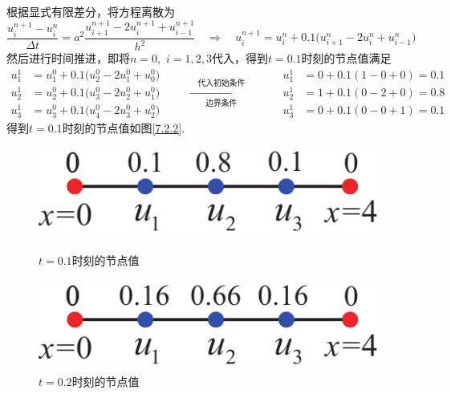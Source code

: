 \solve 根据显式有限差分，将方程离散为
\begin{equation*}
	\dfrac{u_i^{n+1}-u_i^n}{\Delta t} = a^2 \dfrac{u_{i+1}^{n+1} - 2u_i^{n+1} + u_{i-1}^{n+1}}{h^2}
	\quad \Rightarrow \quad
	u_i^{n+1} = u_i^n + 0.1\big(u_{i+1}^n -2u_i^n + u_{i-1}^n\big)
\end{equation*}
然后进行时间推进，即将$n=0,\,\,i=1,2,3$代入，得到$t=0.1$时刻的节点值满足
\begin{equation*}
	\begin{aligned}
		u_1^1 &= u_1^0 + 0.1\big(u_2^0 - 2u_1^0 + u_0^0\big)\\
		u_2^1 &= u_2^0 + 0.1\big(u_3^0 - 2u_2^0 +u_1^0\big)\\
		u_3^1 &= u_3^0 + 0.1\big(u_4^0 - 2u_3^0 + u_2^0\big)
	\end{aligned}
	\quad \quad \xrightarrow[\mbox{边界条件}]{\quad \mbox{代入初始条件} \quad} \quad \quad 
	\begin{aligned}
		u_1^1 &= 0+0.1(1-0+0)=0.1\\
		u_2^1 &= 1+0.1(0-2+0)=0.8\\
		u_3^1 &= 0 + 0.1(0-0+1)=0.1
	\end{aligned}
\end{equation*}
得到$t=0.1$时刻的节点值如图\ref{7.2.2}.
\begin{figure}[!htb]
	\centering
	\begin{minipage}{0.4\linewidth}
		\centering
		\includegraphics[width=0.6\linewidth]{pic/7.2.2.pdf}
		\vspace*{-0.8em}
		\caption{$t=0.1$时刻的节点值}
		\label{7.2.2}
	\end{minipage}
	\begin{minipage}{0.4\linewidth}
		\centering
		\includegraphics[width=0.6\linewidth]{pic/7.2.3.pdf}
		\vspace*{-0.5em}
		\caption{$t=0.2$时刻的节点值}
		\label{7.2.3}
	\end{minipage}
\end{figure}

